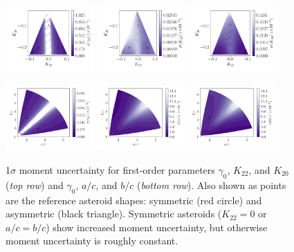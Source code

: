 \documentclass[fleqn,usenatbib]{mnras}
\begin{document}
\begin{figure}
  \includegraphics[width=0.3\textwidth]{figs/probe-space-theta-1-sigma.pdf}\hfill
  \includegraphics[width=0.3\textwidth]{figs/probe-space-theta-2-sigma.pdf}\hfill
  \includegraphics[width=0.3\textwidth]{figs/probe-space-theta-3-sigma.pdf}

  \includegraphics[width=0.3\textwidth]{figs/probe-space-ab-1-sigma.pdf}\hfill
  \includegraphics[width=0.3\textwidth]{figs/probe-space-ab-a-sigma.pdf}\hfill
  \includegraphics[width=0.3\textwidth]{figs/probe-space-ab-b-sigma.pdf}

  \caption{1$\sigma$ moment uncertainty for first-order parameters $\gamma_0$, $K_{22}$, and $K_{20}$ (\textit{top row}) and $\gamma_0$, $a/c$, and $b/c$ (\textit{bottom row}). Also shown as points are the reference asteroid shapes: symmetric (red circle) and asymmetric (black triangle). Symmetric asteroids ($K_{22}=0$ or $a/c=b/c$) show increased moment uncertainty, but otherwise moment uncertainty is roughly constant.}
  \label{fig:scan-space-sigma}
\end{figure}
\end{document}
